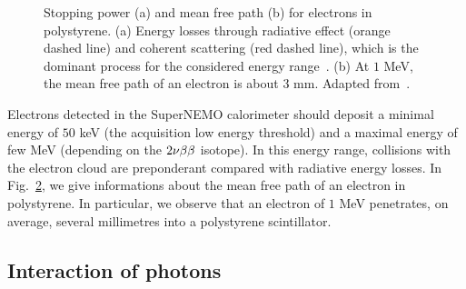 \begin{figure}[h]
\begin{subfigure}[t]{0.48\textwidth}
    \captionsetup{justification=centering}
    \caption{\label{subfig:electron_free_path}}
  \end{subfigure}
  \caption{Stopping power (a) and mean free path (b) for electrons in polystyrene.
    (a) Energy losses through radiative effect (orange dashed line) and coherent scattering (red dashed line), which is the dominant process for the considered energy range~\cite{web:nist_estar}.
    (b) At $1$ MeV, the mean free path of an electron is about $3$ mm.
    Adapted from~\cite{HuberThesis}.
  }
\end{figure}
Electrons detected in the SuperNEMO calorimeter should deposit a minimal energy of $50$ keV (the acquisition low energy threshold) and a maximal energy of few MeV (depending on the $2\nu\beta\beta$ isotope).
In this energy range, collisions with the electron cloud are preponderant compared with radiative energy losses.
In Fig.~\ref{subfig:electron_free_path}, we give informations about the mean free path of an electron in polystyrene.
In particular, we observe that an electron of $1$ MeV penetrates, on average, several millimetres into a polystyrene scintillator.


\subsection{Interaction of photons}

